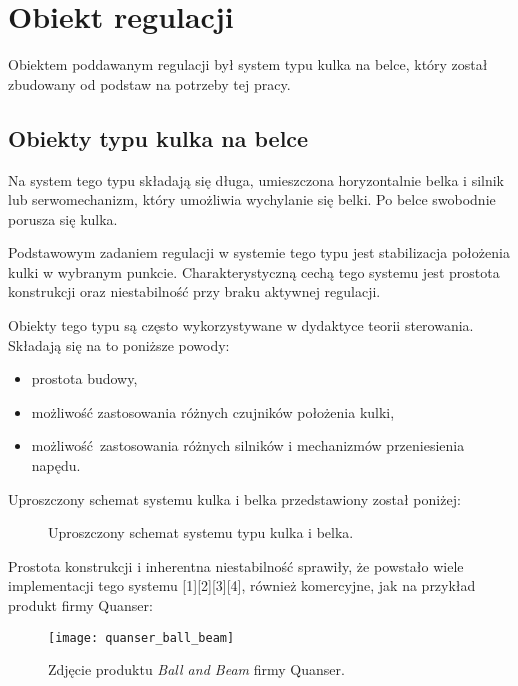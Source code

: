 \chapter{Obiekt regulacji}
\label{cha:ch2_obiekt_regulacji}

Obiektem poddawanym regulacji był system typu kulka na belce, który został zbudowany od podstaw na potrzeby tej pracy.

\section{Obiekty typu kulka na belce}

Na system tego typu składają się długa, umieszczona horyzontalnie belka i silnik lub serwomechanizm, który umożliwia wychylanie się belki.
Po belce swobodnie porusza się kulka.

Podstawowym zadaniem regulacji w systemie tego typu jest stabilizacja położenia kulki w wybranym punkcie.
Charakterystyczną cechą tego systemu jest prostota konstrukcji oraz niestabilność przy braku aktywnej regulacji.

Obiekty tego typu są często wykorzystywane w dydaktyce teorii sterowania. Składają się na to poniższe powody:

\begin{itemize}
	\item prostota budowy,
	\item możliwość zastosowania różnych czujników położenia kulki,
	\item możliwość zastosowania różnych silników i mechanizmów przeniesienia napędu.
\end{itemize}

Uproszczony schemat systemu kulka i belka przedstawiony został poniżej:

\begin{figure}[H]
	\centering
	
	\caption{Uproszczony schemat systemu typu kulka i belka.}
	\label{fig:kulka_belka_schemat_uproszczony}
\end{figure}

Prostota konstrukcji i inherentna niestabilność sprawiły, że powstało wiele implementacji tego systemu [1][2][3][4], również komercyjne, jak na przykład produkt firmy Quanser:

\begin{figure}[H]
	\centering
	\texttt{[image: quanser\_ball\_beam]}
	\caption{Zdjęcie produktu \textit{Ball and Beam} firmy Quanser.}
	\label{fig:quanser_ball_beam}
\end{figure}

